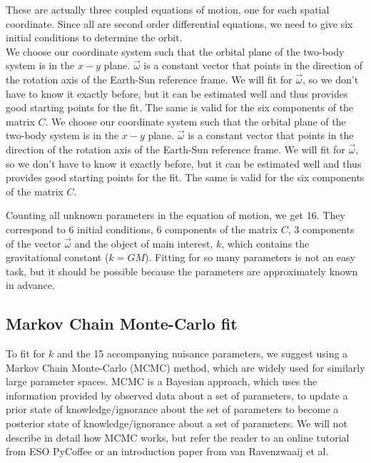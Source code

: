 \documentclass[prb,preprint]{revtex4-1}
\begin{document}
These are actually three coupled equations of motion, one for each spatial coordinate. Since all are second order differential equations, we need to give six initial conditions to determine the orbit.\\
We choose our coordinate system such that the orbital plane of the two-body system is in the $x-y$ plane. $\vec{\omega}$ is a constant vector that points in the direction of the rotation axis of the Earth-Sun reference frame. We will fit for $\vec{\omega}$, so we don't have to know it exactly before, but it can be estimated well and thus provides good starting points for the fit. The same is valid for the six components of the matrix $C$.
We choose our coordinate system such that the orbital plane of the two-body system is in the $x-y$ plane. $\vec{\omega}$ is a constant vector that points in the direction of the rotation axis of the Earth-Sun reference frame. We will fit for $\vec{\omega}$, so we don't have to know it exactly before, but it can be estimated well and thus provides good starting points for the fit. The same is valid for the six components of the matrix $C$.

Counting all unknown parameters in the equation of motion, we get
16. They correspond to 6 initial conditions, 6 components of the
matrix $C$, 3 components of the vector $\vec{\omega}$ and the object
of main interest, $k$, which contains the gravitational constant ($k =
GM$). Fitting for so many parameters is not an easy task, but it
should be possible because the parameters are approximately known in
advance.

\subsection{Markov Chain Monte-Carlo fit}

To fit for $k$ and the 15 accompanying nuisance parameters, we suggest
using a Markov Chain Monte-Carlo (MCMC) method, which are widely used
for similarly large parameter spaces.  MCMC is a Bayesian approach,
which uses the information provided by observed data about a set of
parameters, to update a prior state of knowledge/ignorance about the
set of parameters to become a posterior state of knowledge/ignorance
about a set of parameters. We will not describe in detail how MCMC
works, but refer the reader to an online tutorial from ESO
PyCoffee\cite{esopycoffee} or an introduction paper from van
Ravenzwaaij et al.\cite{vanRavenzwaaij16}
\end{document}

